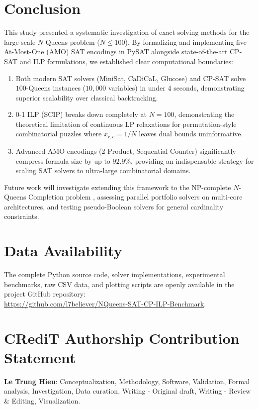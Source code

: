 \documentclass[a4paper,fleqn]{cas-sc}
\begin{document}
\section{Conclusion}
\label{sec:conclusion}
This study presented a systematic investigation of exact solving methods for the large-scale $N$-Queens problem ($N \le 100$). By formalizing and implementing five At-Most-One (AMO) SAT encodings in PySAT alongside state-of-the-art CP-SAT and ILP formulations, we established clear computational boundaries:
\begin{enumerate}
    \item Both modern SAT solvers (MiniSat, CaDiCaL, Glucose) and CP-SAT solve $100$-Queens instances ($10,000$ variables) in under 4 seconds, demonstrating superior scalability over classical backtracking.
    \item 0-1 ILP (SCIP) breaks down completely at $N = 100$, demonstrating the theoretical limitation of continuous LP relaxations for permutation-style combinatorial puzzles where $x_{r, c} = 1/N$ leaves dual bounds uninformative.
    \item Advanced AMO encodings (2-Product, Sequential Counter) significantly compress formula size by up to $92.9\%$, providing an indispensable strategy for scaling SAT solvers to ultra-large combinatorial domains.
\end{enumerate}
Future work will investigate extending this framework to the NP-complete $N$-Queens Completion problem \citep{bell1969queens}, assessing parallel portfolio solvers on multi-core architectures, and testing pseudo-Boolean solvers for general cardinality constraints.

\section*{Data Availability}
The complete Python source code, solver implementations, experimental benchmarks, raw CSV data, and plotting scripts are openly available in the project GitHub repository: \\
\url{https://github.com/l7believer/NQueens-SAT-CP-ILP-Benchmark}.

\section*{CRediT Authorship Contribution Statement}
\textbf{Le Trung Hieu}: Conceptualization, Methodology, Software, Validation, Formal analysis, Investigation, Data curation, Writing - Original draft, Writing - Review \& Editing, Visualization.
\end{document}
